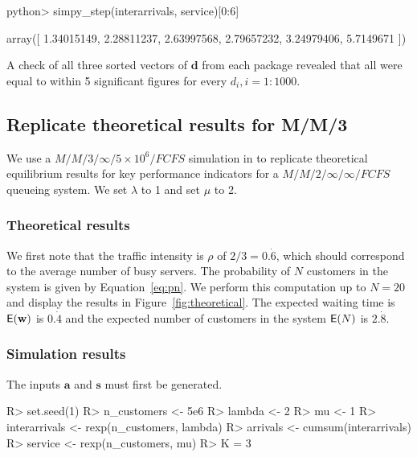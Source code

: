\documentclass[article]{jss}
\begin{document}
\begin{CodeChunk}
\begin{CodeInput}
python> simpy_step(interarrivals, service)[0:6]
\end{CodeInput}
\begin{CodeOutput}
array([ 1.34015149,  2.28811237,  2.63997568,  2.79657232,  3.24979406, 
	5.7149671 ])
\end{CodeOutput}
\end{CodeChunk}

A check of all three sorted vectors of $\mathbf{d}$ from each package revealed that all were equal to within 5 significant figures for every $d_i, i = 1:1000$.  

\subsection{Replicate theoretical results for M/M/3}

We use a $M/M/3/\infty/5 \times 10^6/FCFS$ simulation in  to replicate theoretical equilibrium results for key performance indicators for a $M/M/2/\infty/\infty/FCFS$ queueing system. We set $\lambda$ to 1 and set $\mu$ to 2.

\subsubsection{Theoretical results}

We first note that the traffic intensity is $\rho$ of $2/3 = 0.\dot{6}$, which should correspond to the average number of busy servers. The probability of $N$ customers in the system is given by Equation~\ref{eq:pn}. We perform this computation up to $N = 20$ and display the results in Figure~\ref{fig:theoretical}. The expected waiting time is $\mathsf{E}(\mathbf{w})$ is $0.\dot{4}$ and the expected number of customers in the system $\mathsf{E}(N)$ is $2.\dot{8}$.

\subsubsection{Simulation results}

The inputs $\mathbf{a}$ and $\mathbf{s}$ must first be generated. 

\begin{CodeChunk}
\begin{CodeInput}
R> set.seed(1) 
R> n_customers <- 5e6
R> lambda <- 2
R> mu <- 1
R> interarrivals <- rexp(n_customers, lambda)
R> arrivals <- cumsum(interarrivals)
R> service <- rexp(n_customers, mu)
R> K = 3
\end{CodeInput}
\end{CodeChunk}
\end{document}
